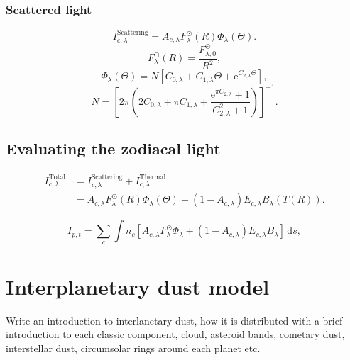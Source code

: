 \documentclass{aa}
\begin{document}
\subsubsection{Scattered light}
\begin{equation}\label{eq: scat_term}
    I^\mathrm{Scattering}_{c, \lambda} = A_{c, \lambda} F_\lambda^\odot(R) \Phi_\lambda(\Theta).
\end{equation}
\begin{equation}
    F_\lambda^\odot(R) = \frac{F_{\lambda,0}^\odot}{R^2},
\end{equation}
\begin{equation}
    \Phi_{\lambda}(\Theta)=N\left[C_{0, \lambda}+C_
    {1, \lambda} \Theta+\mathrm{e}^{C_{2, \lambda} \Theta}\right],
\end{equation}
\begin{equation}
    N = \left[ 2\pi \left( 2 C_{0, \lambda} + \pi C_{1, \lambda} + \frac{\mathrm{e}^{\pi C_{2, \lambda}} + 1}{{C^2_{2, \lambda}} + 1} \right)\right]^{-1}.
\end{equation}

\subsection{Evaluating the zodiacal light}
\begin{align}
    I^\mathrm{Total}_{c, \lambda} &= I^\mathrm{Scattering}_{c,\lambda} + I^\mathrm{Thermal}_{c,\lambda}\\
    &= A_{c, \lambda} F_\lambda^\odot(R) \Phi_\lambda(\Theta) + \left( 1 - A_{c, \lambda} \right) E_{c,\lambda} B_\lambda(T(R)).
\end{align}

\begin{equation}\label{eq: intensity}
    I_{p,t} = \sum_c \int n_c \left[  A_{c, \lambda} F_\lambda^\odot \Phi_\lambda + \left( 1 - A_{c, \lambda} \right) E_{c,\lambda} B_\lambda \right]\,\mathrm ds,
\end{equation}

\section{Interplanetary dust model}
Write an introduction to interlanetary dust, how it is distributed with a brief introduction to each classic component, cloud, asteroid bands, cometary dust, interstellar dust, circumsolar rings around each planet etc.
\end{document}
